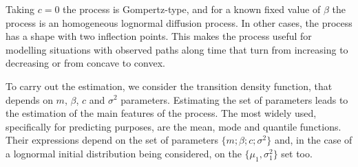 \documentclass{sig-alternate}
\begin{document}
Taking $c=0$ the process is Gompertz-type, and for a known fixed value of $\beta$ the process is an homogeneous lognormal diffusion process. In other cases, the process has a shape with two inflection points. This makes the process useful for modelling situations with observed paths along time that turn from increasing to decreasing or from concave to convex.

To carry out the estimation, we consider the transition density function, that depends on $m$, $\beta$, $c$ and $\sigma^2$ parameters. Estimating the set of parameters leads to the estimation of the main features of the process. The most widely used, specifically for predicting purposes, are the mean, mode and quantile functions. Their expressions depend on the set of parameters $\{m;\beta; c; \sigma^2\}$ and, in the case of a lognormal initial distribution being considered, on the $\{ \mu_1, \sigma_1^2 \}$ set too.
\end{document}
